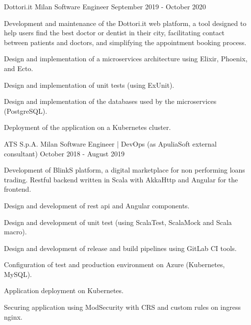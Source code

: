 \documentclass{resume} %
\begin{document}

\cvEntry
  {Dottori.it}
  {Milan}
  {Software Engineer}
  {September 2019 - October 2020}{
    \begin{cvEntryItems}
      \item Development and maintenance of the Dottori.it web platform, a tool designed to help
            users find the best doctor or dentist in their city, facilitating contact between
            patients and doctors, and simplifying the appointment booking process.
      \item Design and implementation of a microservices architecture using Elixir, Phoenix,
            and Ecto.
      \item Design and implementation of unit tests (using ExUnit).
      \item Design and implementation of the databases used by the microservices (PostgreSQL).
      \item Deployment of the application on a Kubernetes cluster.
    \end{cvEntryItems}
}


\cvEntry
  {ATS S.p.A.}
  {Milan}
  {Software Engineer | DevOps (as ApuliaSoft external consultant)}
  {October 2018 - August 2019}{
    \begin{cvEntryItems}
      \item Development of BlinkS platform, a digital marketplace for non performing loans trading.
            Restful backend written in Scala with AkkaHttp and Angular for the frontend.
      \item Design and development of rest api and Angular components.
      \item Design and development of unit test (using ScalaTest, ScalaMock and Scala macro).
      \item Design and development of release and build pipelines using GitLab CI tools.
      \item Configuration of test and production environment on Azure (Kubernetes, MySQL).
      \item Application deployment on Kubernetes.
      \item Securing application using ModSecurity with CRS and custom rules on ingress nginx.
    \end{cvEntryItems}
  }
\end{document}
